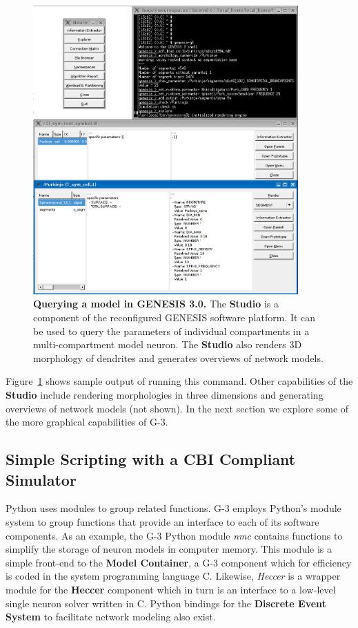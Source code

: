 \documentclass[12pt]{article}
\begin{document}
\begin{figure}[ht]
  \begin{center}
    \includegraphics[width=4in]{figures/studio-screenshot.eps}
  \end{center}
  \caption{ {\bf Querying a model in GENESIS 3.0.} The {\bf Studio} is
    a component of the reconfigured GENESIS software platform. It can
    be used to query the parameters of individual compartments in a
    multi-compartment model neuron. The {\bf Studio} also renders 3D
    morphology of dendrites and generates overviews of network models.
  }
  \label{fig:cbi-studio}
\end{figure}

Figure~\ref{fig:cbi-studio} shows sample output of running this
command.  Other capabilities of the {\bf Studio} include rendering
morphologies in three dimensions and generating overviews of network
models (not shown).  In the next section we explore some of the more
graphical capabilities of G-3.


\subsection{Simple Scripting with a CBI Compliant Simulator}
\label{ss-apens}

Python uses modules to group related functions.  G-3 employs Python's
module system to group functions that provide an interface to each of
its software components.
As an example, the G-3 Python module {\it nmc} contains functions to
simplify the storage of neuron models in computer memory.  This module
is a simple front-end to the {\bf Model Container}, a G-3 component
which for efficiency is coded in the system programming language C.
Likewise, {\it Heccer} is a wrapper module for the {\bf Heccer}
component which in turn is an interface to a low-level single neuron
solver written in C.  Python bindings for the {\bf Discrete Event System} to facilitate network modeling also exist.
\end{document}
